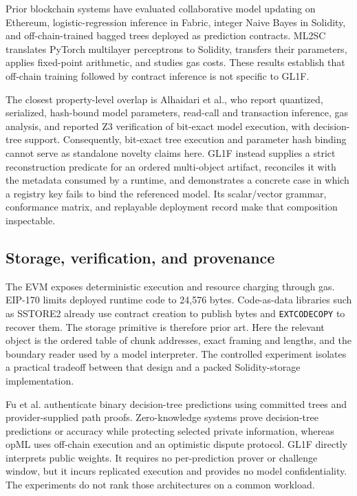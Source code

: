 \documentclass{ledger}
\newcommand{\codeword}[1]{\texttt{#1}}
\begin{document}
Prior blockchain systems have evaluated collaborative model updating on
Ethereum, logistic-regression inference in Fabric, integer Naive Bayes in
Solidity, and off-chain-trained bagged trees deployed as prediction
contracts.\cite{harris2019decentralized,drungilas2021federated,badruddoja2022predict,kadadha2022behavior}
ML2SC translates PyTorch multilayer perceptrons to Solidity, transfers their
parameters, applies fixed-point arithmetic, and studies gas costs.
\cite{li2024ml2sc} These results establish that off-chain training followed by
contract inference is not specific to GL1F.

The closest property-level overlap is Alhaidari et al., who report quantized,
serialized, hash-bound model parameters, read-call and transaction inference,
gas analysis, and reported Z3 verification of bit-exact model execution,
with decision-tree support.\cite{alhaidari2025onchain} Consequently, bit-exact tree
execution and parameter hash binding cannot serve as standalone novelty
claims here. GL1F instead supplies a strict reconstruction predicate for an
ordered multi-object artifact, reconciles it with the metadata consumed by a
runtime, and demonstrates a concrete case in which a registry key fails to
bind the referenced model. Its scalar/vector grammar, conformance matrix, and
replayable deployment record make that composition inspectable.

\subsection{Storage, verification, and provenance}

The EVM exposes deterministic execution and resource charging through gas.
\cite{wood2014ethereum} EIP-170 limits deployed runtime code to 24,576 bytes.
\cite{buterin2016eip170} Code-as-data libraries such as SSTORE2 already use
contract creation to publish bytes and \codeword{EXTCODECOPY} to recover
them.\cite{sequence_sstore2} The storage primitive is therefore prior art.
Here the relevant object is the ordered table of chunk addresses, exact
framing and lengths, and the boundary reader used by a model interpreter.
The controlled experiment isolates a practical tradeoff between that design
and a packed Solidity-storage implementation.

Fu et al. authenticate binary decision-tree predictions using committed
trees and provider-supplied path proofs.\cite{fu2023vdt} Zero-knowledge
systems prove decision-tree predictions or accuracy while protecting selected
private information,\cite{zhang2020decisiontreezk,singh2022zkpipelines}
whereas opML uses off-chain execution and an optimistic dispute protocol.
\cite{conway2024opml} GL1F directly interprets public weights. It requires no
per-prediction prover or challenge window, but it incurs replicated execution
and provides no model confidentiality. The experiments do not rank those
architectures on a common workload.
\end{document}
